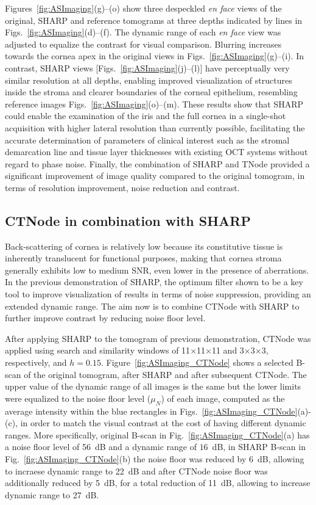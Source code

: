 Figures~\ref{fig:ASImaging}(g)--(o) show three despeckled \textit{en face} views of the original, SHARP and reference tomograms at three depths indicated by lines in Figs.~\ref{fig:ASImaging}(d)--(f). The dynamic range of each \textit{en face} view was adjusted to equalize the contrast for visual comparison. Blurring increases towards the cornea apex in the original views in Figs.~\ref{fig:ASImaging}(g)--(i). In contrast, SHARP views [Figs.~\ref{fig:ASImaging}(j)--(l)] have perceptually very similar resolution at all depths, enabling improved visualization of structures inside the stroma and clearer boundaries of the corneal epithelium, resembling reference images Figs.~\ref{fig:ASImaging}(o)--(m). These results show that SHARP could enable the examination of the iris and the full cornea in a single-shot acquisition with higher lateral resolution than currently possible, facilitating the accurate determination of parameters of clinical interest such as the stromal demarcation line and tissue layer thicknesses with existing OCT systems without regard to phase noise. Finally, the combination of SHARP and TNode provided a significant improvement of image quality compared to the original tomogram, in terms of resolution improvement, noise reduction and contrast.

\subsection{CTNode in combination with SHARP}

Back-scattering of cornea is relatively low because its constitutive tissue is inherently translucent for functional purposes, making that cornea stroma generally exhibits low to medium SNR, even lower in the presence of aberrations. In the previous demonstration of SHARP, the optimum filter shown to be a key tool to improve visualization of results in terms of noise suppression, providing an extended dynamic range. The aim now is to combine CTNode with SHARP to further improve contrast by reducing noise floor level.

After applying SHARP to the tomogram of previous demonstration, CTNode was applied using search and similarity windows of 11$\times$11$\times$11 and 3$\times$3$\times$3, respectively, and $h = 0.15$. Figure~\ref{fig:ASImaging_CTNode} shows a selected B-scan of the original tomogram, after SHARP and after subsequent CTNode. The upper value of the dynamic range of all images is the same but the lower limits were equalized to the noise floor level ($\mu_N$) of each image, computed as the average intensity within the blue rectangles in Figs.~\ref{fig:ASImaging_CTNode}(a)-(c), in order to match the visual contrast at the cost of having different dynamic ranges. More specifically, original B-scan in Fig.~\ref{fig:ASImaging_CTNode}(a) has a noise floor level of 56~dB and a dynamic range of $16$~dB, in SHARP B-scan in Fig.~\ref{fig:ASImaging_CTNode}(b) the noise floor was reduced by 6~dB, allowing to incraese dynamic range to 22~dB and after CTNode noise floor was additionally reduced by 5~dB, for a total reduction of 11~dB, allowing to increase dynamic range to 27~dB.

